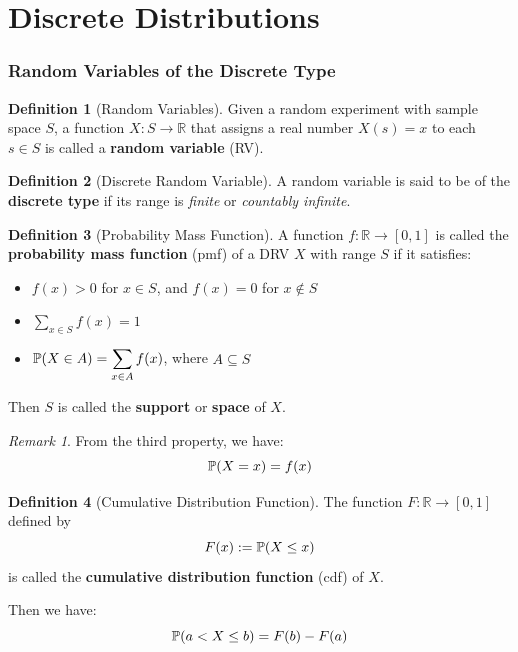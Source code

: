 \documentclass[10pt,UTF8]{article}
\newenvironment{definition box}
{\begin{tcolorbox}[colback=blue!5!white,colframe=blue!75!black,parbox=false,before upper=\par,before lower=\par]}
{\end{tcolorbox}}
\newenvironment{theorem box}
{\begin{tcolorbox}[colback=yellow!5!white,colframe=yellow!75!black,parbox=false,before upper=\par,before lower=\par]}
{\end{tcolorbox}}
\theoremstyle{definition}
\newtheorem{definition inner}{Definition}[section]
\newenvironment{definition}[1][]
{\begin{definition box}\begin{definition inner}[#1]\hfill\par}
{\end{definition inner}\end{definition box}}
\theoremstyle{plain}
\newtheorem{theorem inner}{Theorem}[section]
\theoremstyle{definition}
\newtheorem*{proof inner}{\textit{Proof}}
\theoremstyle{remark}
\newtheorem*{remark}{\textit{Remark}}
\newcommand{\Prob}{\mathbb{P}\qty}
\begin{document}
\part*{Discrete Distributions}

\section{Random Variables of the Discrete Type}

\begin{definition}[Random Variables]
    Given a random experiment with sample space $S$,
    a function $X\colon S\rightarrow \mathbb{R}$
    that assigns a real number $X(s)=x$ to each $s\in S$
    is called a \textbf{random variable} (RV).
\end{definition}

\begin{definition}[Discrete Random Variable]
    A random variable is said to be of the \textbf{discrete type}
    if its range is \emph{finite} or \emph{countably infinite}.
\end{definition}

\begin{definition}[Probability Mass Function]
    A function $f\colon\mathbb{R}\rightarrow[0,1]$
    is called the \textbf{probability mass function} (pmf) of
    a DRV $X$ with range $S$ if it satisfies:
    \begin{itemize}
        \item $f(x)>0$ for $x\in S$, and $f(x)=0$ for $x\notin S$
        \item $\displaystyle\sum_{x\in S}f(x)=1$
        \item $\displaystyle \Prob(X\in A)=\sum_{x\in A}f(x)$, where $A\subseteq S$
    \end{itemize}
    Then $S$ is called the \textbf{support} or \textbf{space} of $X$.
\end{definition}

\begin{remark}
    From the third property, we have:
    \begin{equation*}
        \Prob(X=x) = f(x)
    \end{equation*}
\end{remark}


\begin{definition}[Cumulative Distribution Function]
    The function $F\colon\mathbb{R}\rightarrow[0,1]$
    defined by
    \begin{equation*}
        F(x) := \Prob(X\leq x)
    \end{equation*}
    is called the \textbf{cumulative distribution function} (cdf) of $X$.
\end{definition}
Then we have:
\begin{equation*}
    \Prob(a<X\leq b) = F(b) - F(a)
\end{equation*}
\end{document}

